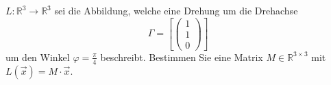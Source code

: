 \( L : \mathbb{R}^3 \to \mathbb{R}^3 \) sei die Abbildung, welche eine Drehung um die Drehachse
\[
\Gamma = \left[ \left( \begin{matrix}
1 \\
1 \\
0
\end{matrix} \right) \right]
\]
um den Winkel \( \varphi = \frac{\pi}{4} \) beschreibt. Bestimmen Sie eine Matrix \( M \in \mathbb{R}^{3 \times 3} \) mit \( L(\vec{x}) = M \cdot \vec{x} \).
